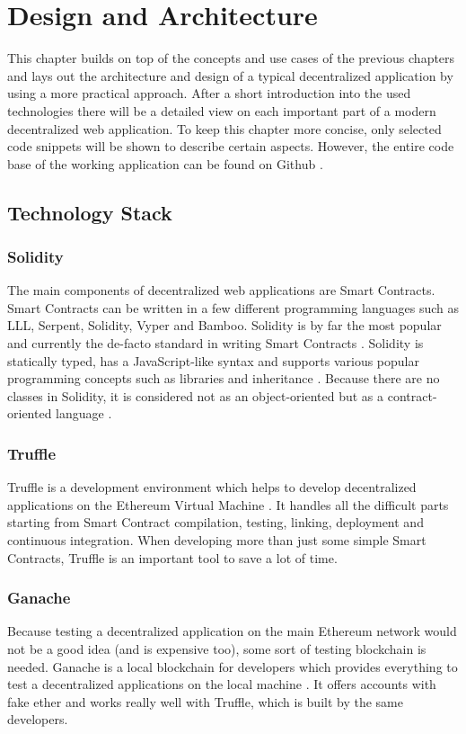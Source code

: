 \chapter{Design and Architecture}
\label{cha:DesignArchitecture}

This chapter builds on top of the concepts and use cases of the previous chapters and lays out the architecture and design of a typical decentralized application by using a more practical approach. After a short introduction into the used technologies there will be a detailed view on each important part of a modern decentralized web application. To keep this chapter more concise, only selected code snippets will be shown to describe certain aspects. However, the entire code base of the working application can be found on Github \cite{CherryPool}.

\section{Technology Stack}
\subsection{Solidity}
The main components of decentralized web applications are Smart Contracts. Smart Contracts can be written in a few different programming languages such as LLL, Serpent, Solidity, Vyper and Bamboo. Solidity is by far the most popular and currently the de-facto standard in writing Smart Contracts \cite{AntonopoulosWood2018}. Solidity is statically typed, has a JavaScript-like syntax and supports various popular programming concepts such as libraries and inheritance \cite{SolidityDocumentation}. Because there are no classes in Solidity, it is considered not as an object-oriented but as a contract-oriented language \cite{Solidity}.

\subsection{Truffle}
Truffle is a development environment which helps to develop decentralized applications on the Ethereum Virtual Machine \cite{Truffle}. It handles all the difficult parts starting from Smart Contract compilation, testing, linking, deployment and continuous integration. When developing more than just some simple Smart Contracts, Truffle is an important tool to save a lot of time.

\subsection{Ganache}
Because testing a decentralized application on the main Ethereum network would not be a good idea (and is expensive too), some sort of testing blockchain is needed. Ganache is a local blockchain for developers which provides everything to test a decentralized applications on the local machine \cite{Ganache}. It offers accounts with fake ether and works really well with Truffle, which is built by the same developers.

